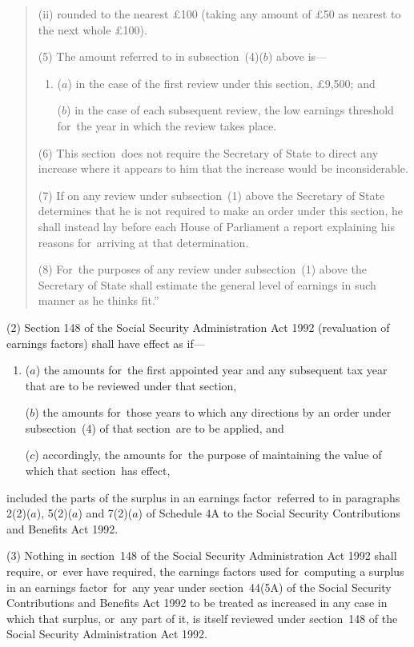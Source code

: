 \documentclass[12pt,a4paper]{article}
\begin{document}
\begin{quotation}
\begin{enumerate}
\begin{enumerate}
(ii) rounded to the nearest £100 (taking any amount of £50 as nearest to the next whole £100).
\end{enumerate}
\end{enumerate}

(5) The amount referred to in subsection~(4)($b$)  above is—
\begin{enumerate}\item[]
($a$) in the case of the first review under this section, £9,500; and

($b$) in the case of each subsequent review, the low earnings threshold for~the year in which the review takes place.
\end{enumerate}

(6) This section~does not require the Secretary of State to direct any increase where it appears to him that the increase would be inconsiderable.

(7) If on any review under subsection~(1)  above the Secretary of State determines that he is not required to make an order under this section, he shall instead lay before each House of Parliament a report explaining his reasons for~arriving at that determination.

(8) For~the purposes of any review under subsection~(1)  above the Secretary of State shall estimate the general level of earnings in such manner as he thinks fit.”
\end{quotation}

(2) Section 148 of the Social Security Administration Act 1992 (revaluation of earnings factors) shall have effect as if—
\begin{enumerate}\item[]
($a$) the amounts for~the first appointed year and any subsequent tax year that are to be reviewed under that section,

($b$) the amounts for~those years to which any directions by an order under subsection~(4)  of that section~are to be applied, and

($c$) accordingly, the amounts for~the purpose of maintaining the value of which that section~has effect,
\end{enumerate}
included the parts of the surplus in an earnings factor~referred to in paragraphs 2(2)($a$), 5(2)($a$)  and 7(2)($a$)  of Schedule 4A to the Social Security Contributions and Benefits Act 1992. 

(3) Nothing in section~148 of the Social Security Administration Act 1992 shall require, or~ever have required, the earnings factors used for~computing a surplus in an earnings factor~for~any year under section~44(5A)  of the Social Security Contributions and Benefits Act 1992 to be treated as increased in any case in which that surplus, or~any part of it, is itself reviewed under section~148 of the Social Security Administration Act 1992. 
\end{document}
